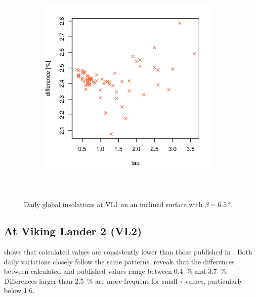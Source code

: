 \begin{figure}[h]
\begin{subfigure}[t]{\subfigureWidth}
            \includegraphics[height=\graphicsHeight]{sections/appendix/insolation-calculation-verification/plots/h-diff-bet-exp-calc-at-vl1-with-beta-65-deg.png}
            \label{fig:sub:comparative-global-insolation-at-vl1-beta-optimal-percentage-differences}
    \end{subfigure}\\[0.8ex]
    \caption[Daily global insolations at Viking Lander 1 on an inclined surface with $\beta=\SI{6.5}{\degree}$]
    {Daily global insolations at \ac{VL1} on an inclined surface with $\beta=\SI{6.5}{\degree}$.}
    \label{fig:plot:comparative-global-insolation-at-vl1-beta-optimal}
\vspace{-2ex}
\end{figure}

\subsection{At Viking Lander 2 (VL2)}
 shows that calculated values are consistently lower than those published in . Both daily variations closely follow the same patterns.  reveals that the differences between calculated and published values range between \SI{0.4}{\percent} and \SI{3.7}{\percent}. Differences larger than \SI{2.5}{\percent} are more frequent for small $\tau$ values, particularly below 1.6.

